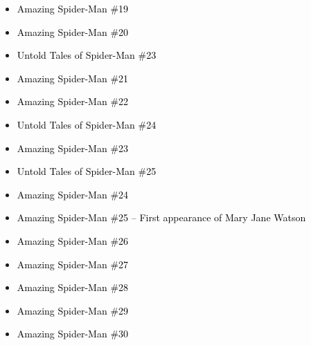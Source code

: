 \documentclass[12pt]{article}
\newcommand{\checkbox}{\raisebox{0.0ex}{\fbox{\rule{0ex}{1.5ex} \rule{1.5ex}{0ex}}}}
\begin{document}
\begin{center}
\begin{tcolorbox}[colback=white!95!gray, colframe=black, width=0.9\textwidth, arc=4mm, auto outer arc, boxrule=0.8pt]
\begin{itemize}[left=0pt,label={\checkbox}]
    \item \textcolor{black}{Amazing Spider-Man \#19}
    \item \textcolor{black}{Amazing Spider-Man \#20}
    \item \textcolor{black}{Untold Tales of Spider-Man \#23}
    \item \textcolor{black}{Amazing Spider-Man \#21}
    \item \textcolor{black}{Amazing Spider-Man \#22}
    \item \textcolor{black}{Untold Tales of Spider-Man \#24}
    \item \textcolor{black}{Amazing Spider-Man \#23}
    \item \textcolor{black}{Untold Tales of Spider-Man \#25}
    \item \textcolor{black}{Amazing Spider-Man \#24}
    \item \textcolor{black}{Amazing Spider-Man \#25 – First appearance of Mary Jane Watson}
    \item \textcolor{black}{Amazing Spider-Man \#26}
    \item \textcolor{black}{Amazing Spider-Man \#27}
    \item \textcolor{black}{Amazing Spider-Man \#28}
    \item \textcolor{black}{Amazing Spider-Man \#29}
    \item \textcolor{black}{Amazing Spider-Man \#30}
\end{itemize}
\end{tcolorbox}
\end{center}
\end{document}
